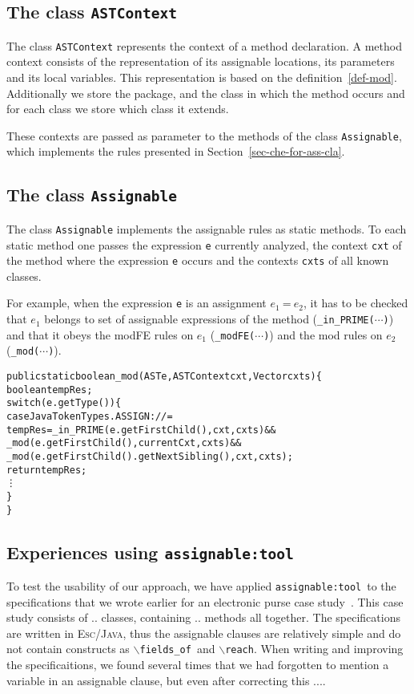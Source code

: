 \documentclass[a4paper]{llncs}
\newcommand{\escj}{\textsc{Esc/Java}}
\newcommand{\modtool}{\texttt{assignable:tool}}
\newcommand{\fieldsof}{\texttt{\(\backslash\)fields\_of}}
\newcommand{\reach}{\texttt{\(\backslash\)reach}}
\begin{document}
\subsection{The class \texttt{ASTContext}}
\label{sub-sec-cla-ast-con}
The class \texttt{ASTContext} represents the context of a method
declaration. A method context consists of the representation of its
assignable locations, its parameters and its local variables. This
representation is based on the definition~\ref{def-mod}. Additionally
we store the package, and the class in which the method
occurs and for each class we store which class it extends.

These contexts are passed as parameter to the methods of the class
\texttt{Assignable}, which implements the rules presented in
Section~\ref{sec-che-for-ass-cla}.




\subsection{The class \texttt{Assignable}}
\label{sub-sec-the-cla-ass}

The class \texttt{Assignable} implements the assignable rules as
static methods. To each static method one passes the expression
\texttt{e} currently analyzed, the context \texttt{cxt} of the method
where the expression \texttt{e} occurs and the contexts \texttt{cxts}
of all known classes.

For example, when the expression \texttt{e} is an assignment
$e_1\:\texttt{=}\:e_2$, it has to be checked that $e_1$ belongs to set
of assignable expressions of the method
(\texttt{\_in\_PRIME($\cdots$)}) and that it obeys the
\textsf{modFE} rules on $e_1$ (\texttt{\_modFE($\cdots$)}) and the
\textsf{mod} rules on $e_2$ (\texttt{\_mod($\cdots$)}).
\begin{alltt}
public static boolean _mod(AST e, ASTContext cxt, Vector cxts)\verb!{!	
  boolean tempRes;	
  switch(e.getType())\verb!{!	
    case JavaTokenTypes.ASSIGN:{\it // =}
      tempRes = _in_PRIME(e.getFirstChild(),cxt,cxts) &&
       _mod(e.getFirstChild(),currentCxt,cxts) &&
       _mod(e.getFirstChild().getNextSibling(),cxt,cxts);
      return tempRes;
    \vdots 
  \verb!}!
\verb!}!
\end{alltt}




\subsection{Experiences using \modtool}
\label{sub-sec-usi-the-too}
To test the usability of our approach, we have applied \modtool\ to
the specifications that we wrote earlier for an electronic purse case
study~\cite{CatanoH02a}. This case study consists of .. classes,
containing .. methods all together. The specifications are written in
\escj, thus the assignable clauses are relatively simple and do not
contain constructs as \fieldsof\ and \reach. When writing and
improving the specificaitions, we found several times that we had
forgotten to mention a variable in an assignable clause, but even
after correcting this ....
\end{document}

